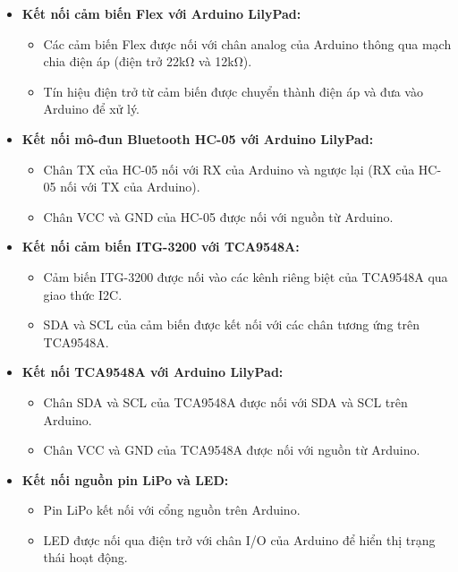 \begin{itemize}
    \item \textbf{Kết nối cảm biến Flex với Arduino LilyPad:}
    \begin{itemize}
        \item Các cảm biến Flex được nối với chân analog của Arduino thông qua mạch chia điện áp (điện trở 22kΩ và 12kΩ).
        \item Tín hiệu điện trở từ cảm biến được chuyển thành điện áp và đưa vào Arduino để xử lý.
    \end{itemize}

    \item \textbf{Kết nối mô-đun Bluetooth HC-05 với Arduino LilyPad:}
    \begin{itemize}
        \item Chân TX của HC-05 nối với RX của Arduino và ngược lại (RX của HC-05 nối với TX của Arduino).
        \item Chân VCC và GND của HC-05 được nối với nguồn từ Arduino.
    \end{itemize}

    \item \textbf{Kết nối cảm biến ITG-3200 với TCA9548A:}
    \begin{itemize}
        \item Cảm biến ITG-3200 được nối vào các kênh riêng biệt của TCA9548A qua giao thức I2C.
        \item SDA và SCL của cảm biến được kết nối với các chân tương ứng trên TCA9548A.
    \end{itemize}

    \item \textbf{Kết nối TCA9548A với Arduino LilyPad:}
    \begin{itemize}
        \item Chân SDA và SCL của TCA9548A được nối với SDA và SCL trên Arduino.
        \item Chân VCC và GND của TCA9548A được nối với nguồn từ Arduino.
    \end{itemize}

    \item \textbf{Kết nối nguồn pin LiPo và LED:}
    \begin{itemize}
        \item Pin LiPo kết nối với cổng nguồn trên Arduino.
        \item LED được nối qua điện trở với chân I/O của Arduino để hiển thị trạng thái hoạt động.
    \end{itemize}
\end{itemize}

